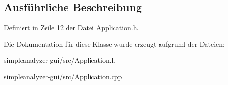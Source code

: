 \subsection{Ausführliche Beschreibung}


Definiert in Zeile 12 der Datei Application.\-h.



Die Dokumentation für diese Klasse wurde erzeugt aufgrund der Dateien\-:\begin{DoxyCompactItemize}
\item 
simpleanalyzer-\/gui/src/Application.\-h\item 
simpleanalyzer-\/gui/src/Application.\-cpp\end{DoxyCompactItemize}
